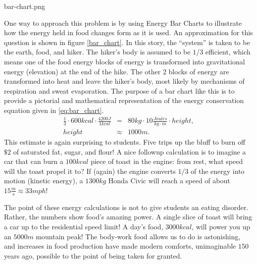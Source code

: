 \documentclass[onecolumn]{article}
\newcommand{\bea}{\begin{eqnarray}}
\newcommand{\eea}{\end{eqnarray}}
\begin{document}
bar-chart.png

One way to approach this problem is by using Energy Bar Charts \cite{energy_bar_charts} to illustrate how the energy held in food changes form as it is used.  An approximation for this question is shown in figure \ref{bar_chart}.  
In this story, the ``system'' is taken to be the earth, food, and hiker.  The hiker's body is assumed to be $1/3$ efficient, which means one of the food energy blocks of energy is transformed into gravitational energy (elevation) at the end of the hike.  
The other $2$ blocks of energy are transformed into heat and leave the hiker's body, most likely by mechanisms of respiration and sweat evaporation. The purpose of a bar chart like this is to provide a pictorial and mathematical representation of the energy conservation equation given in \ref{eq:bar_chart}.         
\bea
\frac{1}{3}\cdot600kcal\cdot\frac{4200J}{1kcal} 
	&=& 80kg\cdot10\frac{Joules}{kg\cdot m}\cdot height , \label{eq:bar_chart}\\
height &\approx&  1000 m .
\eea
This estimate is again surprising to students.  Five trips up the bluff to burn off $\$2$ of saturated fat, sugar, and flour!  A nice followup calculation is to imagine a car that can burn a $100kcal$ piece of toast in the engine: from rest, what speed will the toast propel it to? If (again) the engine converts $1/3$ of the energy into motion (kinetic energy), a $1300kg$ Honda Civic will reach a speed of about $15\frac{m}{s}\approx33mph$!  

The point of these energy calculations is not to give students an eating disorder.  Rather, the numbers show food's amazing power. A single slice of toast will bring a car up to the residential speed limit!  A day's food, $3000kcal$, will power you up an $5000m$ mountain peak! The body-work food allows us to do is astonishing, and increases in food production have made modern  comforts, unimaginable $150$ years ago, possible to the point of being taken for granted.  
\end{document}
